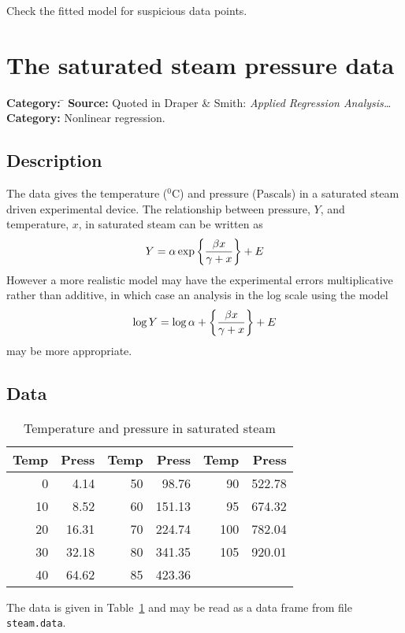 \documentclass{article}
\newcommand{\strutt}{\vrule height 2.5ex depth 0.5ex width 0ex}%
\newcommand{\code}[1]{\texttt{#1}}
\begin{document}
Check the fitted model for suspicious data points.

\clearpage\section{The saturated steam pressure data}
\begin{tabbing}
\textbf{Category:} \= \kill
\textbf{Source:} \> Quoted in Draper \& Smith: \textit{Applied Regression Analysis\ldots}\\
\textbf{Category:} \> Nonlinear regression.
\end{tabbing}

\subsection*{Description}
The data gives the temperature ($^0$C) and pressure (Pascals) in a
saturated steam driven experimental device.  The relationship between
pressure, $Y$, and temperature, $x$, in saturated steam can be written as
\[
Y = \alpha \exp\left\{\beta x \over \gamma + x\right\} + E
\]
However a more realistic model may have the experimental errors
multiplicative rather than additive, in which case an analysis in the log
scale using the model
\[
\log Y = \log\alpha + \left\{\beta x \over \gamma + x\right\} + E
\]
may be more appropriate.

\subsection*{Data}

\begin{table}[ht]
\begin{center}
\begin{tabular}{@{\protect\strutt}|*{3}{rr|}}
\hline
  Temp  &   Press  &    Temp  &   Press  &  Temp  &   Press\\
\hline
     0  &    4.14  &      50  &   98.76  &    90  &  522.78\\
    10  &    8.52  &      60  &  151.13  &    95  &  674.32\\
    20  &   16.31  &      70  &  224.74  &   100  &  782.04\\
    30  &   32.18  &      80  &  341.35  &   105  &  920.01\\
    40  &   64.62  &      85  &  423.36  &        &\\
\hline
\end{tabular}
\end{center}
\caption{\label{steam} Temperature and pressure in saturated steam}
\end{table}
The data is given in Table~\ref{steam} and may be read as a data frame from
file \code{steam.data}.
\end{document}
